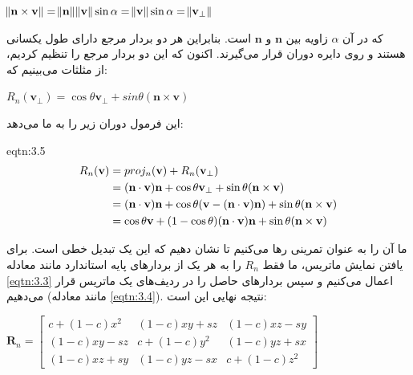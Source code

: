 {\begin{spacing}{1.5}
        \begin{center}
            $\norm{\textbf{n}\times\textbf{v}}=\norm{\textbf{n}}\norm{\textbf{v}}\sin\alpha=\norm{\textbf{v}}\sin\alpha=\norm{\textbf{v}_{\perp}}$
        \end{center}

        که در آن $\alpha$ زاویه بین $\textbf{n}$ و $\textbf{n}$ است.
        بنابراین هر دو بردار مرجع دارای طول یکسانی هستند و روی دایره دوران قرار می‌گیرند.
        اکنون که این دو بردار مرجع را تنظیم کردیم، از مثلثات می‌بینیم که:

        \begin{center}
            $R_{n}(\textbf{v}_{\perp})=\cos\theta\textbf{v}_{\perp}+sin\theta(\textbf{n}\times\textbf{v})$
        \end{center}

        این فرمول دوران زیر را به ما می‌دهد:

        \begin{eqtn}{eqtn:3.5}
            \centering
            \begin{equation*}
                \centering
                \begin{split}
                    R_{n}(\textbf{v})&=proj_{n}(\textbf{v})+R_{n}(\textbf{v}_{\perp})\\
                    &=(\textbf{n}\cdot\textbf{v})\textbf{n}+\cos\theta\textbf{v}_{\perp}+\sin\theta(\textbf{n}\times\textbf{v})\\
                    &=(\textbf{n}\cdot\textbf{v})\textbf{n}+\cos\theta(\textbf{v}-(\textbf{n}\cdot\textbf{v})\textbf{n})+\sin\theta(\textbf{n}\times\textbf{v})\\
                    &=\cos\theta\textbf{v}+(1-\cos\theta)(\textbf{n}\cdot\textbf{v})\textbf{n}+\sin\theta(\textbf{n}\times\textbf{v})
                \end{split}
            \end{equation*}
        \end{eqtn}

        ما آن را به عنوان تمرینی رها می‌کنیم تا نشان دهیم که این یک تبدیل خطی است.
        برای یافتن نمایش ماتریس، ما فقط $R_{n}$ را به هر یک از بردارهای پایه استاندارد مانند معادله \ref{eqtn:3.3} اعمال می‌کنیم و سپس بردارهای حاصل را در ردیف‌های یک ماتریس قرار می‌دهیم (مانند معادله \ref{eqtn:3.4}).
        نتیجه نهایی این است:

        \begin{center}
            $\textbf{R}_{n}=\begin{bmatrix}
                                c+(1-c)x^{2} & (1-c)xy+sz   & (1-c)xz-sy \\
                                (1-c)xy-sz   & c+(1-c)y^{2} & (1-c)yz+sx \\
                                (1-c)xz+sy   & (1-c)yz-sx   & c+(1-c)z^{2}
            \end{bmatrix}$
        \end{center}


\end{spacing}}
